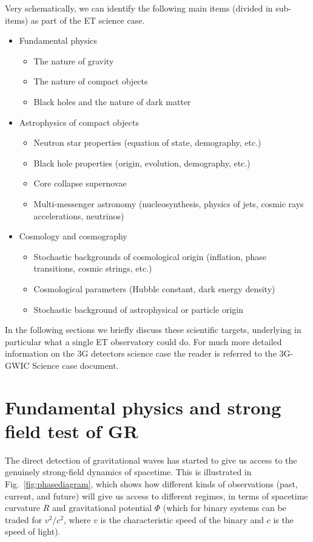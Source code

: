 Very schematically, we can identify the following main items (divided in sub-items) as part of the ET science case.
\begin{itemize}
\item Fundamental physics
  \begin{itemize}
  \item The nature of gravity
  \item The nature of compact objects
  \item Black holes and the nature of dark matter
  \end{itemize}
\item Astrophysics of compact objects
  \begin{itemize}
  \item Neutron star properties (equation of state, demography, etc.)
  \item Black hole properties (origin, evolution, demography, etc.)
  \item Core collapse supernovae
  \item Multi-messenger astronomy (nucleosynthesis, physics of jets, cosmic rays accelerations, neutrinos)
  \end{itemize}
\item Cosmology and cosmography
  \begin{itemize}
  \item Stochastic backgrounds of cosmological origin (inflation, phase transitions, cosmic strings, etc.)
  \item Cosmological parameters (Hubble constant, dark energy density)
  \item Stochastic background of astrophysical or particle origin
  \end{itemize}
\end{itemize}
 
In the following sections we briefly discuss these scientific targets, underlying in particular what a single ET observatory could do. For much more detailed information on the 3G detectors science case the reader is referred to the 3G-GWIC Science case document.   

\section{Fundamental physics and strong field test of GR}\label{sec:fundam}

The direct detection of gravitational waves has started to give us access to the genuinely
strong-field dynamics of spacetime. This is illustrated in Fig.~\ref{fig:phasediagram}, which shows how 
different kinds of observations (past, current, and future) will give us access to different
regimes, in terms of spacetime curvature $R$ and gravitational potential $\Phi$ (which for binary 
systems can be traded for $v^2/c^2$, where $v$ is the characteristic speed of the binary and $c$
is the speed of light). 

